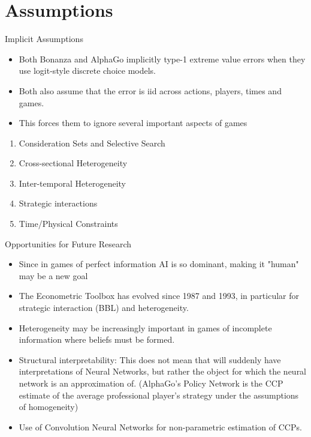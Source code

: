 \documentclass[presentation]{beamer}
\begin{document}
\section{Assumptions}
\label{sec:org80fa1e0}
\begin{frame}[label={sec:orge5bde97}]{Implicit Assumptions}
\begin{itemize}
\item Both Bonanza and AlphaGo implicitly type-1 extreme value errors when
they use logit-style discrete choice models.
\item Both also assume that the error is iid across actions, players,
times and games.
\item This forces them to ignore several important aspects of games
\end{itemize}
\begin{enumerate}
\item Consideration Sets and Selective Search
\item Cross-sectional Heterogeneity
\item Inter-temporal Heterogeneity
\item Strategic interactions
\item Time/Physical Constraints
\end{enumerate}
\end{frame}

\begin{frame}[label={sec:org62573db}]{Opportunities for Future Research}
\begin{itemize}
\item Since in games of perfect information AI is so dominant, making it
"human" may be a new goal
\item The Econometric Toolbox has evolved since 1987 and 1993, in
particular for strategic interaction (BBL) and heterogeneity.
\item Heterogeneity may be increasingly important in games of incomplete
information where beliefs must be formed.
\item Structural interpretability: This does not mean that will suddenly
have interpretations of Neural Networks, but rather the object for
which the neural network is an approximation of. (AlphaGo's Policy
Network is the CCP estimate of the average professional player's
strategy under the assumptions of homogeneity)
\item Use of Convolution Neural Networks for non-parametric estimation of
CCPs.
\end{itemize}
\end{frame}
\end{document}
